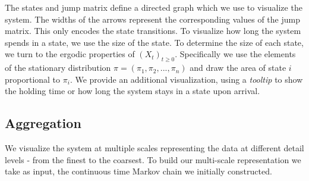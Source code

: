 The states and jump matrix define a directed graph which we use to visualize the system. The widths of the arrows represent the corresponding values of the jump matrix. This only encodes the state transitions. To visualize how long the system spends in a state, we use the size of the state.
To determine the size of each state, we turn to the ergodic properties of $(X_t)_{t \ge 0}$. Specifically
we use the elements of the stationary distribution $\pi = (\pi_1, \pi_2, ..., \pi_n)$ and draw the area of
state $i$ proportional to $\pi_i$. %
We provide an additional visualization, using a \emph{tooltip} to show the holding time or how long the system stays in a state upon arrival.


\subsection{Aggregation}
\label{sec:framework-aggregation}

We visualize the system at multiple scales  representing
the data at different detail levels - from the finest to the coarsest. To build our multi-scale representation we take as input, the continuous time Markov chain we initially constructed. 


